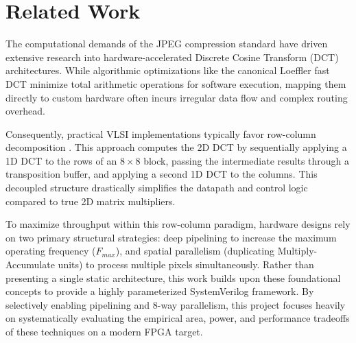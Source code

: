 \section{Related Work}

The computational demands of the JPEG compression standard \cite{jpeg_standard} have driven extensive research into hardware-accelerated Discrete Cosine Transform (DCT) architectures. While algorithmic optimizations like the canonical Loeffler fast DCT \cite{loeffler1989} minimize total arithmetic operations for software execution, mapping them directly to custom hardware often incurs irregular data flow and complex routing overhead.

Consequently, practical VLSI implementations typically favor row-column decomposition \cite{vlsi_dct_survey}. This approach computes the 2D DCT by sequentially applying a 1D DCT to the rows of an $8 \times 8$ block, passing the intermediate results through a transposition buffer, and applying a second 1D DCT to the columns. This decoupled structure drastically simplifies the datapath and control logic compared to true 2D matrix multipliers.

To maximize throughput within this row-column paradigm, hardware designs rely on two primary structural strategies: deep pipelining to increase the maximum operating frequency ($F_{max}$), and spatial parallelism (duplicating Multiply-Accumulate units) to process multiple pixels simultaneously. Rather than presenting a single static architecture, this work builds upon these foundational concepts to provide a highly parameterized SystemVerilog framework. By selectively enabling pipelining and 8-way parallelism, this project focuses heavily on systematically evaluating the empirical area, power, and performance tradeoffs of these techniques on a modern FPGA target.

